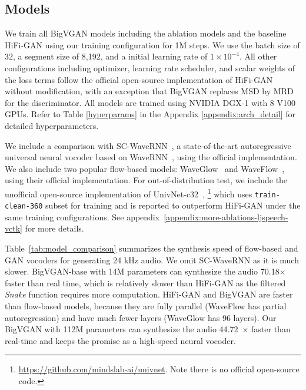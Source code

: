 \documentclass{article} \usepackage{iclr2023_conference,times}
\theoremstyle{plain}
\theoremstyle{definition}
\theoremstyle{remark}
\begin{document}
\vspace{-.2cm}
\subsection{Models}
\vspace{-.1cm}
We train all BigVGAN models including the ablation models and the baseline HiFi-GAN using our training configuration for 1M steps. We use the batch size of 32, a segment size of 8,192, and a initial learning rate of $1\times10^{-4}$. All other configurations including optimizer, learning rate scheduler, and scalar weights of the loss terms follow the official open-source implementation of HiFi-GAN \citep{kong2020hifi} without modification, with an exception that BigVGAN replaces MSD by MRD for the discriminator. All models are trained using NVIDIA DGX-1 with 8 V100 GPUs. Refer to Table \ref{hyperparams} in the Appendix \ref{appendix:arch_detail} for detailed hyperparameters.

{We include a comparison with SC-WaveRNN~\citep{paul2020speaker}, a state-of-the-art autoregressive universal neural vocoder based on WaveRNN~\citep{kalchbrenner2018efficient}, using the official implementation. We also include two popular flow-based models: WaveGlow~\citep{prenger2019waveglow} and WaveFlow~\citep{ping2019waveflow}, using their official implementation. 
For out-of-distribution test, we include the unofficial open-source implementation of UnivNet-c32~\citep{jang2021univnet}, \footnote{\url{https://github.com/mindslab-ai/univnet}. Note there is no official open-source code.}  which uses \texttt{train-clean-360} subset for training and is reported to outperform HiFi-GAN under the same training configurations. See appendix~\ref{appendix:more-ablations-ljspeech-vctk} for more details.}


Table~\ref{tab:model_comparison} summarizes the synthesis speed of flow-based and GAN vocoders for generating 24 kHz audio. We omit SC-WaveRNN as it is much slower. 
BigVGAN-base with 14M parameters can synthesize the audio 70.18$\times$ faster than real time, which is relatively slower than HiFi-GAN as the filtered \emph{Snake} function requires more computation.
HiFi-GAN and BigVGAN are faster than flow-based models, because they are fully parallel (WaveFlow has partial autoregression) and have much fewer layers (WaveGlow has 96 layers).
Our BigVGAN with 112M parameters can synthesize the audio 44.72~$\times$ faster than real-time and keeps the promise as a high-speed neural vocoder.
\end{document}
